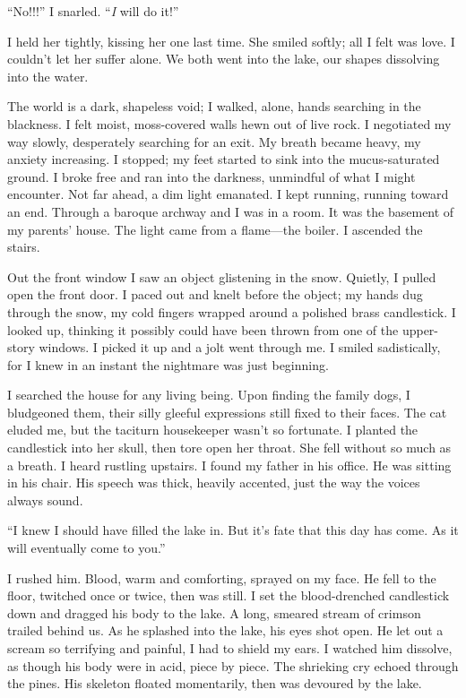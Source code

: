 ``No!!!'' I snarled. ``\emph{I} will do it!''

I held her tightly, kissing her one last time. She smiled softly; all I
felt was love. I couldn't let her suffer alone. We both went into the
lake, our shapes dissolving into the water.

The world is a dark, shapeless void; I walked, alone, hands searching in
the blackness. I felt moist, moss-covered walls hewn out of live rock. I
negotiated my way slowly, desperately searching for an exit. My breath
became heavy, my anxiety increasing. I stopped; my feet started to sink
into the mucus-saturated ground. I broke free and ran into the darkness,
unmindful of what I might encounter. Not far ahead, a dim light
emanated. I kept running, running toward an end. Through a baroque
archway and I was in a room. It was the basement of my parents' house.
The light came from a flame---the boiler. I ascended the stairs.

Out the front window I saw an object glistening in the snow. Quietly, I
pulled open the front door. I paced out and knelt before the object; my
hands dug through the snow, my cold fingers wrapped around a polished
brass candlestick. I looked up, thinking it possibly could have been
thrown from one of the upper-story windows. I picked it up and a jolt
went through me. I smiled sadistically, for I knew in an instant the
nightmare was just beginning.

I searched the house for any living being. Upon finding the family dogs,
I bludgeoned them, their silly gleeful expressions still fixed to their
faces. The cat eluded me, but the taciturn housekeeper wasn't so
fortunate. I planted the candlestick into her skull, then tore open her
throat. She fell without so much as a breath. I heard rustling upstairs.
I found my father in his office. He was sitting in his chair. His speech
was thick, heavily accented, just the way the voices always sound.

``I knew I should have filled the lake in. But it's fate that this day
has come. As it will eventually come to you.''

I rushed him. Blood, warm and comforting, sprayed on my face. He fell to
the floor, twitched once or twice, then was still. I set the
blood-drenched candlestick down and dragged his body to the lake. A
long, smeared stream of crimson trailed behind us. As he splashed into
the lake, his eyes shot open. He let out a scream so terrifying and
painful, I had to shield my ears. I watched him dissolve, as though his
body were in acid, piece by piece. The shrieking cry echoed through the
pines. His skeleton floated momentarily, then was devoured by the lake.

